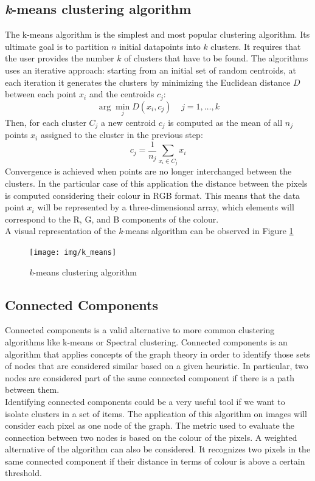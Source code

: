 \documentclass{article}
\begin{document}
{\subsection{\textit{k}-means clustering algorithm} 
The k-means algorithm is the simplest and most popular clustering algorithm. Its ultimate goal is to partition $n$ initial datapoints into $k$ clusters. It requires that the user provides the number $k$ of clusters that have to be found. The algorithms uses an iterative approach: starting from an initial set of random centroids, at each iteration it generates the clusters by minimizing the Euclidean distance $D$ between each point $x_i$  and  the centroids $c_j$:  
$$\arg \min\limits_{j}D(x_i, c_j)\;\;\;\; j = 1, \dots, k$$
Then, for each cluster $C_j$ a new centroid $c_j$ is computed as the mean of all $n_j$ points $x_i$ assigned to the cluster in the previous step: 
$$c_j = \frac{1}{n_j} \sum_{x_i \in C_j} x_i$$
Convergence is achieved when points are no longer interchanged between the clusters.
In the particular case of this application the distance between the pixels is computed considering their colour in RGB format. This means that the data point $x_i$ will be represented by a three-dimensional array, which elements will correspond to the R, G, and B components of the colour. \\
A visual representation of the \textit{k}-means algorithm can be observed in Figure \ref{fig:1}
\begin{figure}[h]
	\centering
	\texttt{[image: img/k\_means]}
	\caption{\textit{k}-means clustering algorithm}
	\label{fig:1}
\end{figure}


\subsection{Connected Components}
Connected components is a valid alternative to more common clustering algorithms like k-means or Spectral clustering. 
Connected components is an algorithm that applies concepts of the graph theory in order to identify those sets of nodes that are considered similar based on a given heuristic. In particular, two nodes are considered part of the same connected component if there is a path between them. \\
Identifying connected components could be a very useful tool if we want to isolate clusters in a set of items. 
The application of this algorithm on images will consider each pixel as one node of the graph. The metric used to evaluate the connection between two nodes is based on the colour of the pixels. A weighted alternative of the algorithm can also be considered. It recognizes two pixels in the same connected component if their distance in terms of colour is above a certain threshold.

}
\end{document}

